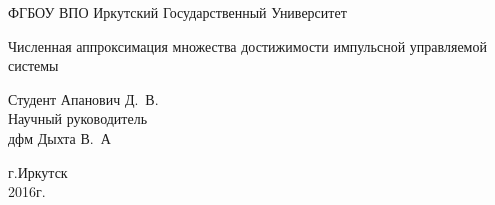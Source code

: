 \begin{titlepage}
  \newpage

  \begin{center}
    ФГБОУ ВПО Иркутский Государственный Университет
  \end{center}


  \vspace{8em}
  
  \begin{center}
    \Large Численная аппроксимация множества достижимости импульсной
    управляемой системы 
  \end{center}
  
  \vspace{2.5em}

  \begin{flushright}
    Студент  Апанович Д.~В.\\
    \vspace{1.5em}
    Научный руководитель \\
    дфм Дыхта В.~А
  \end{flushright}
  
  \vspace{\fill}
  
  \begin{center}
    г.Иркутск\\
    2016г.
  \end{center}
  

\end{titlepage}


